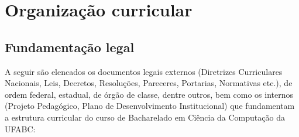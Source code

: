 \section{Organização curricular}
\label{sec:organizacao_curricular}

\subsection{Fundamentação legal}
\label{subsec:fund_legal}

A seguir são elencados os documentos legais externos (Diretrizes Curriculares
Nacionais, Leis, Decretos, Resoluções, Pareceres, Portarias, Normativas etc.),
de ordem federal, estadual, de órgão de classe, dentre outros, bem como os
internos (Projeto Pedagógico, Plano de Desenvolvimento Institucional) que
fundamentam a estrutura curricular do curso de Bacharelado em Ciência da
Computação da UFABC:

